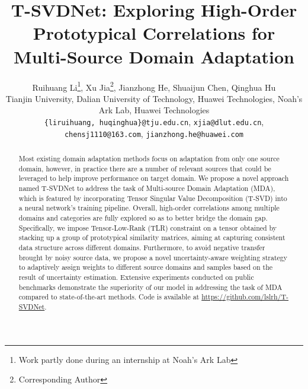 \documentclass[10pt,twocolumn,letterpaper]{article}
\makeatletter
\newcommand{\printfnsymbol}[1]{\textsuperscript{\@fnsymbol{#1}}}
\makeatother
\begin{document}
\title{T-SVDNet: Exploring High-Order Prototypical Correlations for Multi-Source Domain Adaptation}
\author{Ruihuang Li\thanks{Work partly done during an internship at Noah’s Ark Lab}, Xu Jia\thanks{Corresponding Author}, Jianzhong He, Shuaijun Chen, Qinghua Hu\printfnsymbol{2}   \\ \vspace{-0.8em}
	Tianjin University, Dalian University of Technology, Huawei Technologies, Noah’s Ark Lab, Huawei Technologies \\ 
	{\tt\small \{liruihuang, huqinghua\}@tju.edu.cn}, {\tt\small xjia@dlut.edu.cn}, {\tt\small chensj1110@163.com}, {\tt\small jianzhong.he@huawei.com} }




\maketitle
\ificcvfinal\thispagestyle{empty}\fi

\begin{abstract}
	Most existing domain adaptation methods focus on adaptation from only one source domain, however, in practice there are a number of relevant sources that could be leveraged to help improve performance on target domain. We propose a novel approach named T-SVDNet to address the task of Multi-source Domain Adaptation (MDA), which is featured by incorporating Tensor Singular Value Decomposition (T-SVD) into a neural network's training pipeline. Overall, high-order correlations among multiple domains and categories are fully explored so as to better bridge the domain gap. Specifically, we impose Tensor-Low-Rank (TLR) constraint on a tensor obtained by stacking up a group of prototypical similarity matrices, aiming at capturing consistent data structure across different domains. Furthermore, to avoid negative transfer brought by noisy source data, we propose a novel uncertainty-aware weighting strategy to adaptively assign weights to different source domains and samples based on the result of uncertainty estimation. Extensive experiments conducted on public benchmarks demonstrate the superiority of our model in addressing the task of MDA compared to state-of-the-art methods. Code is available at {\small  \url{https://github.com/lslrh/T-SVDNet}}.
\end{abstract}
\end{document}
